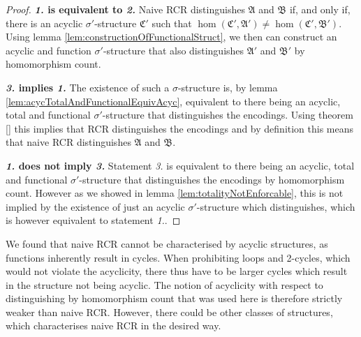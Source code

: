 \begin{proof}
	\textbf{\emph{1.} is equivalent to \emph{2.}}
	Naive RCR distinguishes $\mathfrak A$ and $\mathfrak B$ if, and only if, there is an acyclic $\sigma'$-structure $\mathfrak C'$ such that $\hom(\mathfrak C',\mathfrak A')\neq\hom(\mathfrak C',\mathfrak B')$.
	Using lemma \ref{lem:constructionOfFunctionalStruct}, we then can construct an acyclic and function $\sigma'$-structure that also distinguishes $\mathfrak A'$ and $\mathfrak B'$ by homomorphism count.

	\textbf{\emph{3.} implies \emph{1.}}
	The existence of such a $\sigma$-structure is, by lemma \ref{lem:acycTotalAndFunctionalEquivAcyc}, equivalent to there being an acyclic, total and functional $\sigma'$-structure that distinguishes the encodings.
	Using theorem \ref{} this implies that RCR distinguishes the encodings and by definition this means that naive RCR distinguishes $\mathfrak A$ and $\mathfrak B$.
	
	\textbf{\emph{1.} does not imply \emph{3.}}
	Statement \emph{3.} is equivalent to there being an acyclic, total and functional $\sigma'$-structure that distinguishes the encodings by homomorphism count.
	However as we showed in lemma \ref{lem:totalityNotEnforcable}, this is not implied by the existence of just an acyclic $\sigma'$-structure which distinguishes, which is however equivalent to statement \emph{1.}.
\end{proof}

We found that naive RCR cannot be characterised by acyclic structures, as functions inherently result in cycles. 
When prohibiting loops and 2-cycles, which would not violate the acyclicity, there thus have to be larger cycles which result in the structure not being acyclic.
The notion of acyclicity with respect to distinguishing by homomorphism count that was used here is therefore strictly weaker than naive RCR.
However, there could be other classes of structures, which characterises naive RCR in the desired way.


